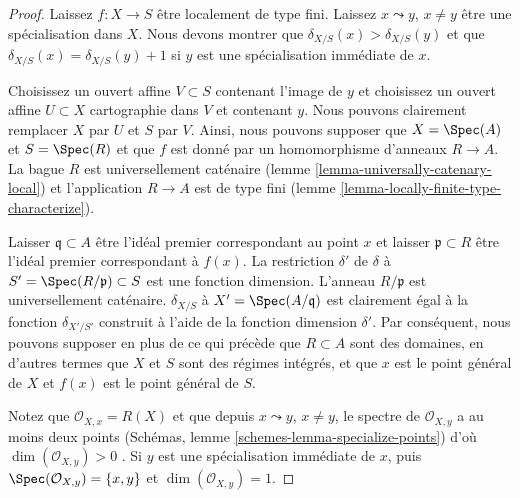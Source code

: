 \begin{proof}
Laissez $f : X \to S$ être localement de type fini. Laissez $x \leadsto y$, $x \not = y$ être une spécialisation dans $X$. Nous devons montrer que $\delta_{X/S}(x) > \delta_{X/S}(y)$ et que $\delta_{X/S}(x) = \delta_{X/S}(y) + 1$ si $y$ est une spécialisation immédiate de $x$.

\medskip\noindent

Choisissez un ouvert affine $V \subset S$ contenant l'image de
$y$ et choisissez un ouvert affine $U \subset X$ cartographie dans $V$
et contenant $y$. Nous pouvons clairement remplacer $X$ par $U$ et
$S$ par $V$. Ainsi, nous pouvons supposer que $X = \Spec(A)$
et $S = \Spec(R)$ et que $f$ est donné par un homomorphisme d'anneaux $R \to A$. La bague $R$ est universellement caténaire (lemme \ref{lemma-universally-catenary-local}) et l'application $R \to A$ est de type fini (lemme \ref{lemma-locally-finite-type-characterize}).

\medskip\noindent

Laisser $\mathfrak q \subset A$ être l'idéal premier correspondant au point $x$ et laisser $\mathfrak p \subset R$ être l'idéal premier correspondant à $f(x)$. La restriction $\delta'$ de $\delta$
à $S' = \Spec(R/\mathfrak p) \subset S$ est une fonction dimension. L'anneau $R/\mathfrak p$ est universellement caténaire. $\delta_{X/S}$ à $X' = \Spec(A/\mathfrak q)$
est clairement égal à la fonction $\delta_{X'/S'}$ construit à l'aide de la fonction dimension $\delta'$. Par conséquent, nous pouvons supposer en plus de ce qui précède que $R \subset A$ sont des domaines, en d'autres termes que $X$ et $S$ sont des régimes intégrés, et que
$x$ est le point général de $X$ et $f(x)$ est le point général de $S$.

\medskip\noindent
Notez que $\mathcal{O}_{X, x} = R(X)$ et que depuis $x \leadsto y$, $x \not = y$, le spectre de $\mathcal{O}_{X, y}$ a au moins deux points (Schémas, lemme \ref{schemes-lemma-specialize-points}) d'où $\dim(\mathcal{O}_{X, y}) > 0$ . Si $y$ est une spécialisation immédiate de $x$, puis $\Spec(\mathcal{O}_{X, y}) = \{x, y\}$ et $\dim(\mathcal{O}_{X, y}) = 1$.


\end{proof}
